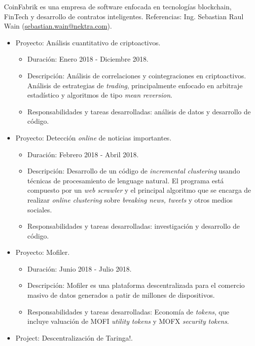 \documentclass[11pt,a4paper,sans]{moderncv}        %
\begin{document}
{CoinFabrik es una empresa de software enfocada en tecnologías blockchain, FinTech y desarrollo de contratos inteligentes.
Referencias: Ing. Sebastian Raul Wain (\href{mailto:sebastian.wain@nektra.com}{sebastian.wain@nektra.com}).
\begin{itemize}%
\item Proyecto: Análisis cuantitativo de criptoactivos.
	\begin{itemize}%
	\item Duración: Enero 2018 - Diciembre 2018.
	\item Descripción: Análisis de correlaciones y cointegraciones en criptoactivos. 
	Análisis de estrategias de \textit{trading}, principalmente enfocado en arbitraje estadístico y algoritmos de tipo \textit{mean reversion}.	
	\item Responsabilidades y tareas desarrolladas: análisis de datos y desarrollo de código.
	\end{itemize}
\item Proyecto: Detección \textit{online} de noticias importantes.
	\begin{itemize}%
	\item Duración: Febrero 2018 - Abril 2018.
	\item Descripción: Desarrollo de un código de \textit{incremental clustering} usando técnicas de procesamiento de lenguage natural.
	El programa está compuesto por un \textit{web scrawler} y el principal algoritmo que se encarga de realizar \textit{online clustering} sobre \textit{breaking news,
	tweets} y otros medios sociales.
	\item Responsabilidades y tareas desarrolladas: investigación y desarrollo de código.
	\end{itemize}
\item Proyecto: Mofiler.
	\begin{itemize}%
	\item Duración: Junio 2018 - Julio 2018.
	\item Descripción: Mofiler es una plataforma descentralizada para el comercio masivo de datos generados a patir de millones de dispositivos.	
	\item Responsabilidades y tareas desarrolladas: Economía de \textit{tokens}, que incluye valuación de MOFI \textit{utility tokens} y MOFX \textit{security tokens}.
	\end{itemize}
\item Project: Descentralización de Taringa!.

\end{itemize}}
\end{document}

